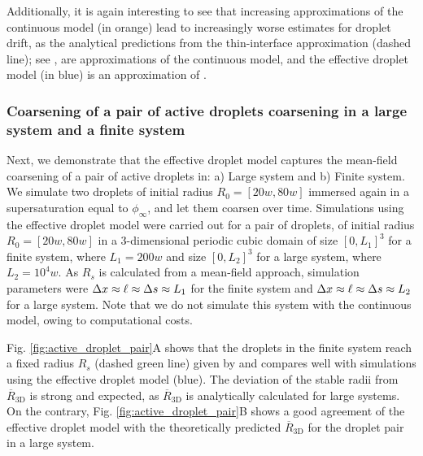 Additionally, it is again interesting to see that increasing approximations of the continuous model (in orange) lead to increasingly worse estimates for droplet drift, as the analytical predictions from the thin-interface approximation (dashed line); see , are approximations of the continuous model, and the effective droplet model (in blue) is an approximation of .


\subsubsection{Coarsening of a pair of active droplets coarsening in a large system and a finite system}

Next, we demonstrate that the effective droplet model captures the mean-field coarsening of a pair of active droplets in: a) Large system and b) Finite system. 
We simulate two droplets of initial radius $R_0 = [20w, 80w]$ immersed again in a supersaturation equal to $\phi_\infty$, and let them coarsen over time.
Simulations using the effective droplet model were carried out for a pair of droplets, of initial radius $R_0 = [20w, 80w]$ in a $3$-dimensional periodic cubic domain of size $[0, L_1]^3$ for a finite system, where $L_1 = 200 w$ and size $[0, L_2]^3$ for a large system, where $L_2 = 10^4 w$.
As $R_s$ is calculated from a mean-field approach, simulation parameters were $\Delta x \approx \ell \approx \Delta s \approx L_1$ for the finite system and  $\Delta x \approx \ell \approx \Delta s \approx L_2$ for a large system.
Note that we do not simulate this system with the continuous model, owing to computational costs.

Fig. \ref{fig:active_droplet_pair}A shows that the droplets in the finite system reach a fixed radius $R_s$ (dashed green line) given by  and compares well with simulations using the effective droplet model (blue).
The deviation of the stable radii from $\overline{R}_\mathrm{3D}$ is strong and expected, as $\overline{R}_\mathrm{3D}$ is analytically calculated for large systems.
On the contrary, Fig. \ref{fig:active_droplet_pair}B shows a good agreement of the effective droplet model with the theoretically predicted $\overline{R}_\mathrm{3D}$ for the droplet pair in a large system.

